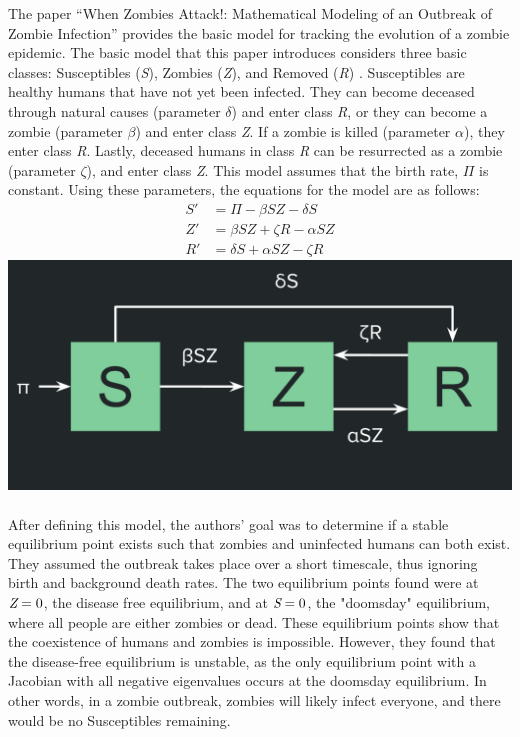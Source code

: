 \documentclass{article}
\begin{document}
The paper ``When Zombies Attack!: Mathematical Modeling of an Outbreak of Zombie Infection” provides the basic model for tracking the evolution of a zombie epidemic. The basic model that this paper introduces considers three basic classes: Susceptibles (\emph{S}), Zombies (\emph{Z}), and Removed (\emph{R}) \cite{zombies}. Susceptibles are healthy humans that have not yet been infected. They can become deceased through natural causes (parameter $\delta$) and enter class \emph{R}, or they can become a zombie (parameter $\beta$) and enter class \emph{Z}. If a zombie is killed (parameter $\alpha$), they enter class \emph{R}. Lastly, deceased humans in class \emph{R} can be resurrected as a zombie (parameter $\zeta$), and enter class \emph{Z}. This model assumes that the birth rate, $\Pi$ is constant. Using these parameters, the equations for the model are as follows:
\begin{align*}
S' &= \Pi - \beta SZ - \delta S \\
Z' &= \beta SZ + \zeta R - \alpha S Z \\
R' &= \delta S + \alpha SZ - \zeta R
\end{align*}
\includegraphics[width=1\textwidth]{SZR Model.png}\\
\\
After defining this model, the authors' goal was to determine if a stable equilibrium point exists such that zombies and uninfected humans can both exist. They assumed the outbreak takes place over a short timescale, thus ignoring birth and background death rates. The two equilibrium points found were at $\emph{Z}=0$, the disease free equilibrium, and at $\emph{S}=0$, the "doomsday" equilibrium, where all people are either zombies or dead. These equilibrium points show that the coexistence of humans and zombies is impossible. However, they found that the disease-free equilibrium is unstable, as the only equilibrium point with a Jacobian with all negative eigenvalues occurs at the doomsday equilibrium. In other words, in a zombie outbreak, zombies will likely infect everyone, and there would be no Susceptibles remaining.
\end{document}
